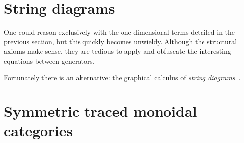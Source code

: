 \section{String diagrams}

One could reason exclusively with the one-dimensional terms detailed in the
previous section, but this quickly becomes unwieldy.
Although the structural axioms make sense, they are tedious to apply and
obfuscate the interesting equations between generators.

Fortunately there is an alternative: the graphical calculus of
\emph{string diagrams}~\cite{joyal1991geometry}.

\section{Symmetric traced monoidal categories}